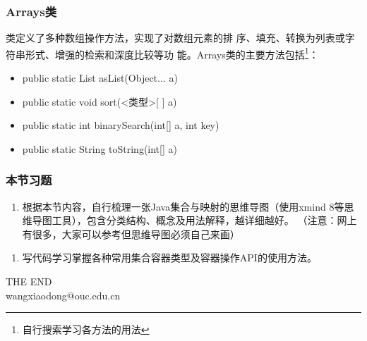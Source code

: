 \begin{frame}[fragile] %
  \frametitle{Arrays类}

   类定义了多种数组操作方法，实现了对数组元素的排
  序、填充、转换为列表或字符串形式、增强的检索和深度比较等功
  能。Arrays类的主要方法包括\footnote{自行搜索学习各方法的用法}：

  \begin{itemize}
  \item public static List asList(Object... a)
  \item public static void sort(<类型>[ ] a)
  \item public static int binarySearch(int[] a, int key)
  \item public static String toString(int[] a)
  \end{itemize}
\end{frame}


\begin{frame}[fragile]
  \frametitle{本节习题}

  \begin{enumerate}
  \item 根据本节内容，自行梳理一张Java集合与映射的思维导图（使用xmind
    8等思维导图工具），包含分类结构、概念及用法解释，越详细越好。{\kai
      （注意：网上有很多，大家可以参考但思维导图必须自己来画）}
  \end{enumerate}
  
  
  \begin{enumerate}
  \item 写代码学习掌握各种常用集合容器类型及容器操作API的使用方法。
  \end{enumerate}

\end{frame}
\begin{frame}[focus]
  \centering
  {\Huge {THE END}} \\
  \vspace{5mm}
  {\Large wangxiaodong@ouc.edu.cn} \\
\end{frame}
